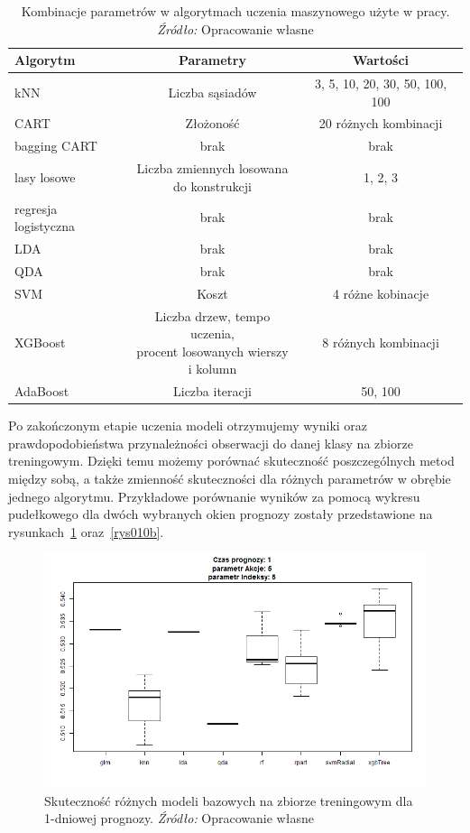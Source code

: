 \documentclass[12pt,a4paper,twoside,openany]{book}
\begin{document}
\begin{table}[ht] 
\caption{Kombinacje parametrów w algorytmach uczenia maszynowego użyte w pracy. \textit{Źródło:} Opracowanie własne}
\label{tab008}
\centering
\begin{tabular}{lcc}
  \hline
Algorytm & Parametry & Wartości \\
  \hline
kNN & Liczba sąsiadów & 3, 5, 10, 20, 30, 50, 100, 100 \\
CART & Złożoność & 20 różnych kombinacji \\
bagging CART & brak & brak \\
lasy losowe & \makecell{Liczba zmiennych losowana\\ do konstrukcji} & 1, 2, 3 \\
regresja logistyczna & brak & brak \\
LDA & brak & brak \\
QDA & brak & brak \\
SVM & Koszt & 4 różne kobinacje \\
XGBoost & \makecell{Liczba drzew, tempo uczenia,\\ procent losowanych wierszy\\ i kolumn} & 8 różnych kombinacji \\
AdaBoost & Liczba iteracji & 50, 100 \\
  \hline
\end{tabular}
\end{table}


Po zakończonym etapie uczenia modeli otrzymujemy wyniki oraz prawdopodobieństwa przynależności obserwacji do danej klasy na zbiorze treningowym. Dzięki temu możemy porównać skuteczność poszczególnych metod między sobą, a także zmienność skuteczności dla różnych parametrów w obrębie jednego algorytmu. Przykładowe porównanie wyników za pomocą wykresu pudełkowego dla dwóch wybranych okien prognozy zostały przedstawione na rysunkach~\ref{rys010a} oraz~\ref{rys010b}.

\begin{figure}
\centering
\includegraphics[scale=0.5]{./rys010a}
\caption{Skuteczność różnych modeli bazowych na zbiorze treningowym dla 1-dniowej prognozy. \textit{Źródło:} Opracowanie własne}\label{rys010a}
\end{figure}
\end{document}
